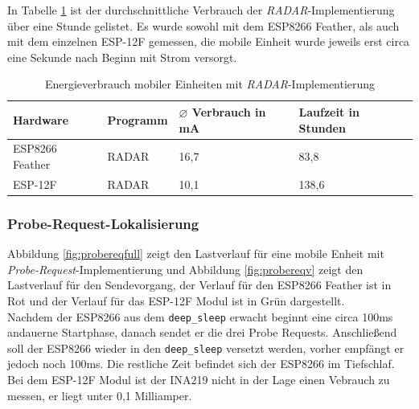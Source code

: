 In Tabelle \ref{table:radarina} ist der durchschnittliche Verbrauch der \emph{RADAR}-Implementierung über eine Stunde gelistet.
Es wurde sowohl mit dem ESP8266 Feather, als auch mit dem einzelnen ESP-12F gemessen, die mobile Einheit wurde jeweils erst circa eine Sekunde nach Beginn mit Strom versorgt.

\begin{table}[h!]
	\centering
	\caption{Energieverbrauch mobiler Einheiten mit \emph{RADAR}-Implementierung}
	\label{table:radarina}
	\begin{tabular}{p{3.5cm}|p{5cm}|p{2.5cm}|p{2.5cm}}
		Hardware & Programm & $\varnothing$ Verbrauch in mA & Laufzeit in Stunden\\
		\hline
		ESP8266 Feather & RADAR & 16,7 & 83,8\\
		ESP-12F & RADAR & 10,1 & 138,6\\
	\end{tabular}
\end{table}

\subsubsection{Probe-Request-Lokalisierung}
\label{ch:phase2:sec:powerprobereq}
Abbildung \ref{fig:probereqfull} zeigt den Lastverlauf für eine mobile Enheit mit \emph{Probe-Request}-Implementierung und Abbildung \ref{fig:probereqv} zeigt den Lastverlauf für den Sendevorgang, der Verlauf für den ESP8266 Feather ist in Rot und der Verlauf für das ESP-12F Modul ist in Grün dargestellt.\\
Nachdem der ESP8266 aus dem \texttt{deep\_sleep} erwacht beginnt eine circa 100ms andauerne Startphase, danach sendet er die drei Probe Requests.
Anschließend soll der ESP8266 wieder in den \texttt{deep\_sleep} versetzt werden, vorher empfängt er jedoch noch 100ms.
Die restliche Zeit befindet sich der ESP8266 im Tiefschlaf. 
Bei dem ESP-12F Modul ist der INA219 nicht in der Lage einen Vebrauch zu messen, er liegt unter 0,1 Milliamper.\\


